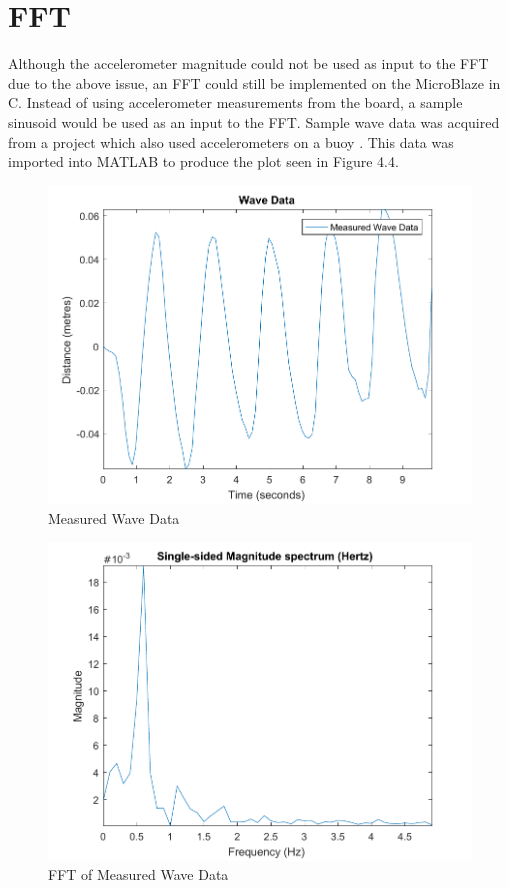\documentclass[12pt,a4paper]{report} %
\begin{document}
\section{FFT}
Although the accelerometer magnitude could not be used as input to the FFT due to the above issue, an FFT could still be implemented on the MicroBlaze in C.
Instead of using accelerometer measurements from the board, a sample sinusoid would be used as an input to the FFT.
Sample wave data was acquired from a project which also used accelerometers on a buoy \cite{reddit}.
This data was imported into MATLAB to produce the plot seen in Figure 4.4.
\begin{figure}[ht]
\centerline{\includegraphics[scale=0.6]{diagrams/wave1}}
\caption{Measured Wave Data}
\end{figure}
\begin{figure}[ht]
\centerline{\includegraphics[scale=0.6]{diagrams/wave2}}
\caption{FFT of Measured Wave Data}
\end{figure}
\end{document}
